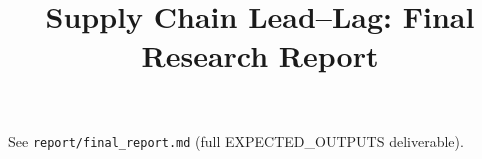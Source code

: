 \documentclass{article}
\begin{document}
\title{Supply Chain Lead--Lag: Final Research Report}
\maketitle
See \texttt{report/final\_report.md} (full EXPECTED\_OUTPUTS deliverable).
\end{document}
